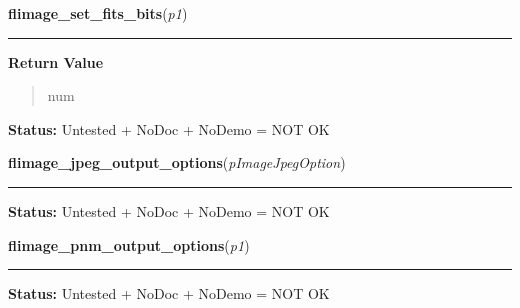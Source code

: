     \vspace{0.5ex}

\hspace{.8\funcindent}\begin{boxedminipage}{\funcwidth}

    \raggedright \textbf{flimage\_set\_fits\_bits}(\textit{p1})

    \vspace{-1.5ex}

    \rule{\textwidth}{0.5\fboxrule}
\setlength{\parskip}{2ex}
\setlength{\parskip}{1ex}
      \textbf{Return Value}
    \vspace{-1ex}

      \begin{quote}
      num

      \end{quote}

\textbf{Status:} Untested + NoDoc + NoDemo = NOT OK



    \end{boxedminipage}

    \label{xformslib:library:flimage_jpeg_output_options}

    \vspace{0.5ex}

\hspace{.8\funcindent}\begin{boxedminipage}{\funcwidth}

    \raggedright \textbf{flimage\_jpeg\_output\_options}(\textit{pImageJpegOption})

    \vspace{-1.5ex}

    \rule{\textwidth}{0.5\fboxrule}
\setlength{\parskip}{2ex}
\setlength{\parskip}{1ex}
\textbf{Status:} Untested + NoDoc + NoDemo = NOT OK



    \end{boxedminipage}

    \label{xformslib:library:flimage_pnm_output_options}

    \vspace{0.5ex}

\hspace{.8\funcindent}\begin{boxedminipage}{\funcwidth}

    \raggedright \textbf{flimage\_pnm\_output\_options}(\textit{p1})

    \vspace{-1.5ex}

    \rule{\textwidth}{0.5\fboxrule}
\setlength{\parskip}{2ex}
\setlength{\parskip}{1ex}
\textbf{Status:} Untested + NoDoc + NoDemo = NOT OK



    \end{boxedminipage}

